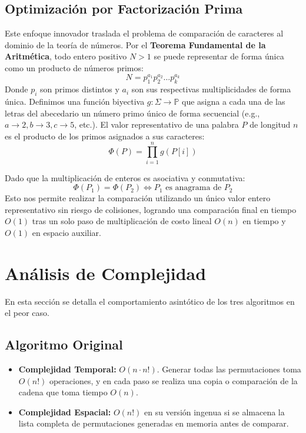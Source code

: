 \documentclass[twocolumn]{article}
\begin{document}
\subsection{Optimización por Factorización Prima}
Este enfoque innovador traslada el problema de comparación de caracteres al dominio de la teoría de números. Por el \textbf{Teorema Fundamental de la Aritmética}, todo entero positivo $N > 1$ se puede representar de forma única como un producto de números primos:
\begin{equation}
N = p_1^{a_1} p_2^{a_2} \dots p_k^{a_k}
\end{equation}
Donde $p_i$ son primos distintos y $a_i$ son sus respectivas multiplicidades de forma única. 
Definimos una función biyectiva $g: \Sigma \to \mathbb{P}$ que asigna a cada una de las letras del abecedario un número primo único de forma secuencial (e.g., $a \to 2, b \to 3, c \to 5$, etc.). El valor representativo de una palabra $P$ de longitud $n$ es el producto de los primos asignados a sus caracteres:
\begin{equation}
\Phi(P) = \prod_{i=1}^{n} g(P[i])
\end{equation}

Dado que la multiplicación de enteros es asociativa y conmutativa:
\begin{equation}
\Phi(P_1) = \Phi(P_2) \iff P_1 \text{ es anagrama de } P_2
\end{equation}
Esto nos permite realizar la comparación utilizando un único valor entero representativo sin riesgo de colisiones, logrando una comparación final en tiempo $O(1)$ tras un solo paso de multiplicación de costo lineal $O(n)$ en tiempo y $O(1)$ en espacio auxiliar.

\section{Análisis de Complejidad}
En esta sección se detalla el comportamiento asintótico de los tres algoritmos en el peor caso.

\subsection{Algoritmo Original}
\begin{itemize}
    \item \textbf{Complejidad Temporal:} $O(n \cdot n!)$. Generar todas las permutaciones toma $O(n!)$ operaciones, y en cada paso se realiza una copia o comparación de la cadena que toma tiempo $O(n)$.
    \item \textbf{Complejidad Espacial:} $O(n!)$ en su versión ingenua si se almacena la lista completa de permutaciones generadas en memoria antes de comparar.
\end{itemize}
\end{document}
